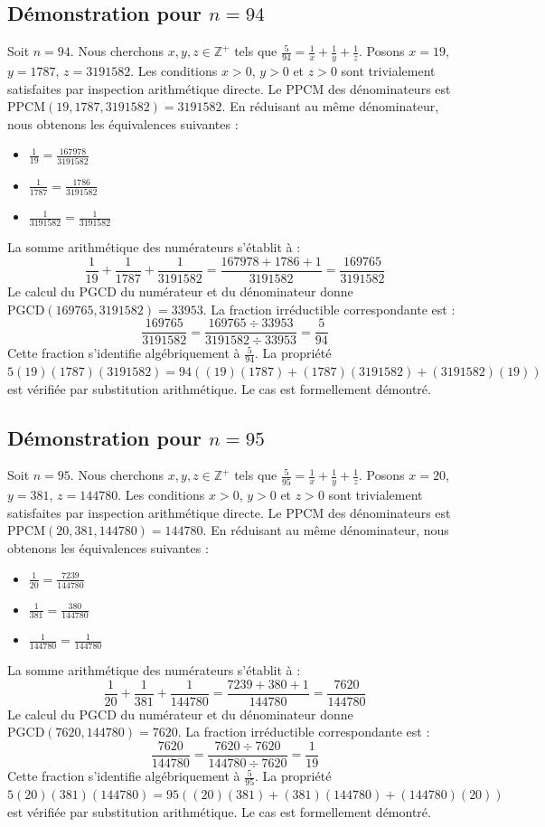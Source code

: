 \documentclass[12pt,a4paper]{article}
\begin{document}
\subsection{Démonstration pour $n = 94$}
Soit $n = 94$. Nous cherchons $x, y, z \in \mathbb{Z}^{+}$ tels que $\frac{5}{94} = \frac{1}{x} + \frac{1}{y} + \frac{1}{z}$.
Posons $x = 19$, $y = 1787$, $z = 3191582$.
Les conditions $x > 0$, $y > 0$ et $z > 0$ sont trivialement satisfaites par inspection arithmétique directe.
Le PPCM des dénominateurs est $\text{PPCM}(19, 1787, 3191582) = 3191582$.
En réduisant au même dénominateur, nous obtenons les équivalences suivantes :
\begin{itemize}
    \item $\frac{1}{19} = \frac{167978}{3191582}$
    \item $\frac{1}{1787} = \frac{1786}{3191582}$
    \item $\frac{1}{3191582} = \frac{1}{3191582}$
\end{itemize}
La somme arithmétique des numérateurs s'établit à :
$$ \frac{1}{19} + \frac{1}{1787} + \frac{1}{3191582} = \frac{167978 + 1786 + 1}{3191582} = \frac{169765}{3191582} $$
Le calcul du PGCD du numérateur et du dénominateur donne $\text{PGCD}(169765, 3191582) = 33953$.
La fraction irréductible correspondante est :
$$ \frac{169765}{3191582} = \frac{169765 \div 33953}{3191582 \div 33953} = \frac{5}{94} $$
Cette fraction s'identifie algébriquement à $\frac{5}{94}$.
La propriété $5(19)(1787)(3191582) = 94((19)(1787) + (1787)(3191582) + (3191582)(19))$ est vérifiée par substitution arithmétique.
Le cas est formellement démontré.

\subsection{Démonstration pour $n = 95$}
Soit $n = 95$. Nous cherchons $x, y, z \in \mathbb{Z}^{+}$ tels que $\frac{5}{95} = \frac{1}{x} + \frac{1}{y} + \frac{1}{z}$.
Posons $x = 20$, $y = 381$, $z = 144780$.
Les conditions $x > 0$, $y > 0$ et $z > 0$ sont trivialement satisfaites par inspection arithmétique directe.
Le PPCM des dénominateurs est $\text{PPCM}(20, 381, 144780) = 144780$.
En réduisant au même dénominateur, nous obtenons les équivalences suivantes :
\begin{itemize}
    \item $\frac{1}{20} = \frac{7239}{144780}$
    \item $\frac{1}{381} = \frac{380}{144780}$
    \item $\frac{1}{144780} = \frac{1}{144780}$
\end{itemize}
La somme arithmétique des numérateurs s'établit à :
$$ \frac{1}{20} + \frac{1}{381} + \frac{1}{144780} = \frac{7239 + 380 + 1}{144780} = \frac{7620}{144780} $$
Le calcul du PGCD du numérateur et du dénominateur donne $\text{PGCD}(7620, 144780) = 7620$.
La fraction irréductible correspondante est :
$$ \frac{7620}{144780} = \frac{7620 \div 7620}{144780 \div 7620} = \frac{1}{19} $$
Cette fraction s'identifie algébriquement à $\frac{5}{95}$.
La propriété $5(20)(381)(144780) = 95((20)(381) + (381)(144780) + (144780)(20))$ est vérifiée par substitution arithmétique.
Le cas est formellement démontré.
\end{document}
